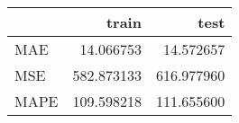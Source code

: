 \begin{tabular}{lrr}
\toprule
{} &       train &        test \\
\midrule
MAE  &   14.066753 &   14.572657 \\
MSE  &  582.873133 &  616.977960 \\
MAPE &  109.598218 &  111.655600 \\
\bottomrule
\end{tabular}
